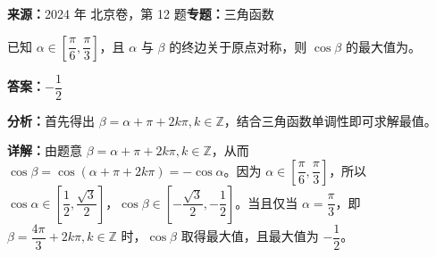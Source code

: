 \begin{question}[points=5]
\textbf{来源：}2024 年 北京卷，第 12 题\quad \textbf{专题：}三角函数\par
已知 $\alpha \in \left[\dfrac{\pi}{6},\dfrac{\pi}{3}\right]$，且 $\alpha$ 与 $\beta$ 的终边关于原点对称，则 $\cos \beta$ 的最大值为。
\fillin[{$-\dfrac{1}{2}$}]
\begin{solution}
\textbf{答案：}$-\dfrac{1}{2}$

\textbf{分析：}首先得出 $\beta = \alpha + \pi + 2k\pi, k \in \mathbb{Z}$，结合三角函数单调性即可求解最值。

\textbf{详解：}由题意 $\beta = \alpha + \pi + 2k\pi, k \in \mathbb{Z}$，从而 $\cos \beta = \cos(\alpha+\pi+2k\pi) = -\cos \alpha$。因为 $\alpha \in [\dfrac{\pi}{6},\dfrac{\pi}{3}]$，所以 $\cos \alpha \in [\dfrac{1}{2},\dfrac{\sqrt{3}}{2}]$，$\cos \beta \in [-\dfrac{\sqrt{3}}{2},-\dfrac{1}{2}]$。当且仅当 $\alpha = \dfrac{\pi}{3}$，即 $\beta = \dfrac{4\pi}{3} + 2k\pi, k \in \mathbb{Z}$ 时，$\cos \beta$ 取得最大值，且最大值为 $-\dfrac{1}{2}$。
\end{solution}
\end{question}

